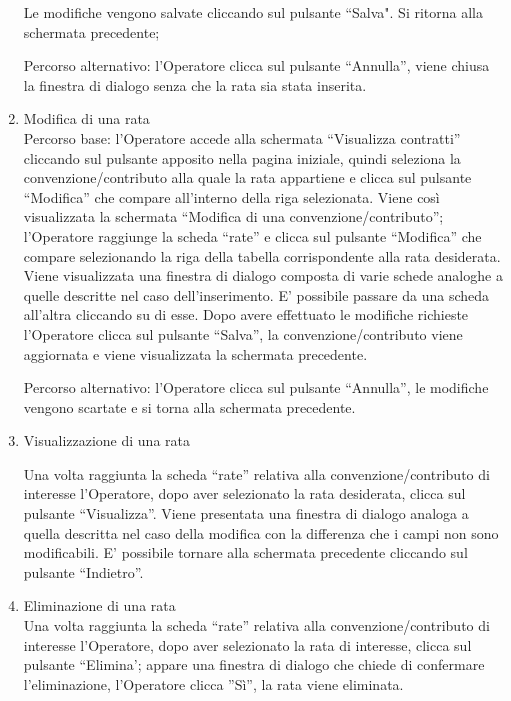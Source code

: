 \begin{enumerate}
Le modifiche vengono salvate cliccando sul pulsante ``Salva". Si ritorna alla schermata precedente;

Percorso alternativo:
l'Operatore clicca sul pulsante ``Annulla'', viene chiusa la finestra di dialogo senza che la rata sia stata inserita.

\item Modifica di una rata\\

Percorso base:
l'Operatore accede alla schermata ``Visualizza contratti'' cliccando sul pulsante apposito nella pagina iniziale, quindi seleziona la convenzione/contributo alla quale la rata appartiene e clicca sul pulsante ``Modifica'' che compare
all'interno della riga selezionata. Viene così visualizzata la schermata ``Modifica di una convenzione/contributo''; l'Operatore raggiunge la scheda ``rate'' e clicca sul pulsante ``Modifica'' che compare selezionando la riga della tabella
corrispondente alla rata desiderata. Viene visualizzata una finestra di dialogo composta di varie schede analoghe a quelle descritte nel caso dell'inserimento. E' possibile passare da una scheda all'altra cliccando su di esse.
Dopo avere effettuato le modifiche richieste l'Operatore clicca sul pulsante ``Salva'', la convenzione/contributo viene aggiornata e viene visualizzata la schermata precedente.

Percorso alternativo:
l'Operatore clicca sul pulsante ``Annulla'', le modifiche vengono scartate e si torna alla schermata precedente.

\item Visualizzazione di una rata

Una volta raggiunta la scheda ``rate'' relativa alla convenzione/contributo di interesse l'Operatore, dopo aver selezionato la rata desiderata, clicca sul pulsante ``Visualizza''. Viene presentata una finestra di dialogo analoga a quella descritta nel caso della modifica 
con la differenza che i campi non sono modificabili. E' possibile tornare alla schermata precedente cliccando sul pulsante ``Indietro''.

\item Eliminazione di una rata\\

Una volta raggiunta la scheda ``rate'' relativa alla convenzione/contributo di interesse l'Operatore, dopo aver selezionato la rata di interesse, clicca sul pulsante ``Elimina'; appare una finestra di dialogo che chiede di confermare
l'eliminazione, l'Operatore clicca ''Sì'', la rata viene eliminata.


\end{enumerate}
